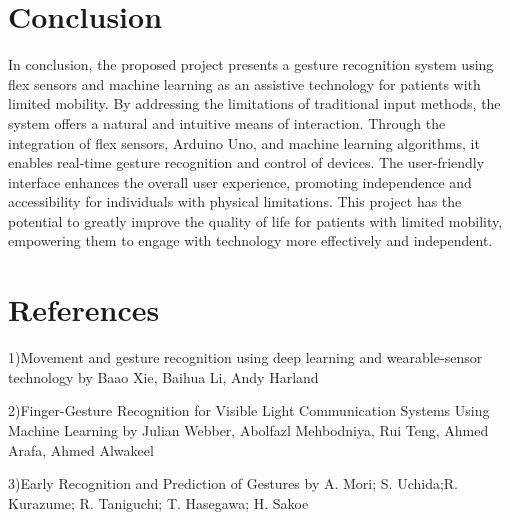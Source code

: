 \documentclass[a4paper,12pt,oneside]{report}
\begin{document}
	
	\newpage
	\chapter{Conclusion}
	\label{chap:Conclusion}
	In conclusion, the proposed project presents a gesture recognition system using flex sensors and machine learning as an assistive technology for patients with limited mobility. By addressing the limitations of traditional input methods, the system offers a natural and intuitive means of interaction. Through the integration of flex sensors, Arduino Uno, and machine learning algorithms, it enables real-time gesture recognition and control of devices. The user-friendly interface enhances the overall user experience, promoting independence and accessibility for individuals with physical limitations. This project has the potential to greatly improve the quality of life for patients with limited mobility, empowering them to engage with technology more effectively and independent.
	
	
	
	


	


	
	
	\newpage
	\chapter{References}
	\label{chap:Method}
 \par
 1)Movement and gesture recognition using deep learning and wearable-sensor technology by Baao Xie, Baihua Li, Andy Harland
\par
2)Finger-Gesture Recognition for Visible Light Communication Systems Using Machine Learning by
Julian Webber, Abolfazl Mehbodniya, Rui Teng, Ahmed Arafa, Ahmed Alwakeel
\par
3)Early Recognition and Prediction of Gestures by A. Mori; S. Uchida;R. Kurazume; R. Taniguchi; T. Hasegawa; H. Sakoe
\\



	


	
	
	
 \newpage
 \nocite{7103186}
 \nocite{8329920}
 \nocite{da2018novel}
 \nocite{tapak2018quadcopter}
 \nocite{mohamed2019controlling}
	
	
 
	
 
	
	
	
	
	
	
	
	
	
	
	
	
	
	
	
	
	
	
	
	
	
	
	
 
\end{document}

